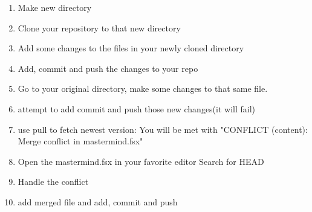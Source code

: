 \documentclass[12 pt,a4paper]{article}
\newcommand{\Fin}{
\vfill
\begin{center}
\textit{ }\label{FIN}
\end{center}}
\begin{document}
\begin{enumerate}
\item Make new directory
\item Clone your repository to that new directory
\item Add some changes to the files in your newly cloned directory
\item Add, commit and push the changes to your repo
\item Go to your original directory, make some changes to that same file.
\item attempt to add commit and push those new changes(it will fail)
\item use pull to fetch newest version: You will be met with "CONFLICT (content): Merge conflict in mastermind.fsx" 
\item Open the mastermind.fsx in your favorite editor Search for HEAD
\item Handle the conflict
\item add merged file and add, commit and push
\end{enumerate}



\Fin
\end{document}
